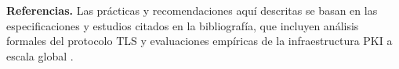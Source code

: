 \noindent\textbf{Referencias.} Las prácticas y recomendaciones aquí descritas se basan en las especificaciones y estudios citados en la bibliografía, que incluyen análisis formales del protocolo TLS y evaluaciones empíricas de la infraestructura PKI a escala global \cite{rfc8446, rfc7525, liu2015, helme2024, sasse2023, nikiforakis2012}.

